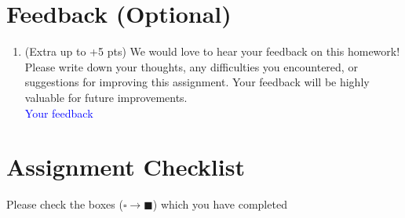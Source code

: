 \documentclass[11pt]{article}
\begin{document}
\section{Feedback (Optional)}
\begin{enumerate}
    \item \textbf{\faPen} (Extra up to +5 pts) We would love to hear your feedback on this homework! Please write down your thoughts, any difficulties you encountered, or suggestions for improving this assignment. 
          Your feedback will be highly valuable for future improvements. \\
          \textcolor{blue}{Your feedback}
\end{enumerate}


\clearpage
\section*{Assignment Checklist}

\noindent Please check the boxes ($\square \rightarrow \blacksquare$) which you have completed
\end{document}
